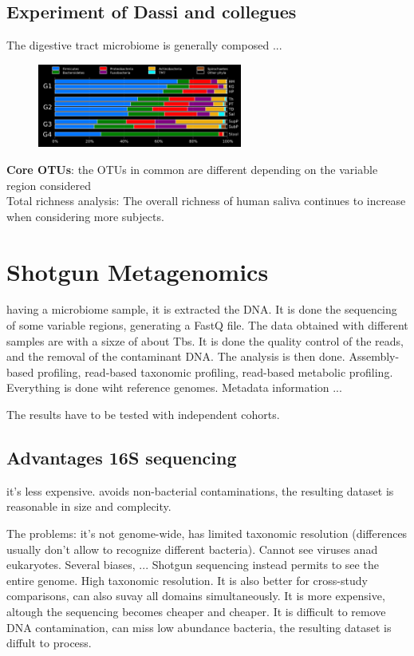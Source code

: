 \section{Experiment of Dassi and collegues}



The digestive tract microbiome is generally composed ...
\begin{figure}[h]
\caption{}
\centering
\includegraphics[width=0.6\textwidth]{gut microbes}
\end{figure}


\textbf{Core OTUs}: the OTUs in common are different depending on the variable region considered
\\
Total richness analysis: The overall richness of human saliva continues to increase when  considering more subjects. 


\chapter{Shotgun Metagenomics}
having a microbiome sample, it is extracted the DNA. It is done the sequencing of some variable regions, generating a FastQ file. The data obtained with different samples are with a sixze of about Tbs. It is done the quality control of the reads, and the removal of the contaminant DNA. The analysis is then done. Assembly-based profiling, read-based taxonomic profiling, read-based metabolic profiling. Everything is done wiht reference genomes. 
Metadata information ...

The results have to be tested with independent cohorts. 

\section{Advantages 16S sequencing}
it's less expensive.  avoids non-bacterial contaminations, the resulting dataset is reasonable in size and complecity.

The problems: it's not genome-wide, has limited taxonomic resolution (differences usually don't allow to recognize different bacteria). Cannot see viruses anad eukaryotes. Several biases, ...
Shotgun sequencing instead permits to see the entire genome. High taxonomic resolution. It is also better for cross-study comparisons, can also suvay all domains simultaneously. It is more  expensive, altough the sequencing becomes cheaper and cheaper. It is difficult to remove DNA contamination, can miss low abundance bacteria, the resulting dataset is diffult to process. 

